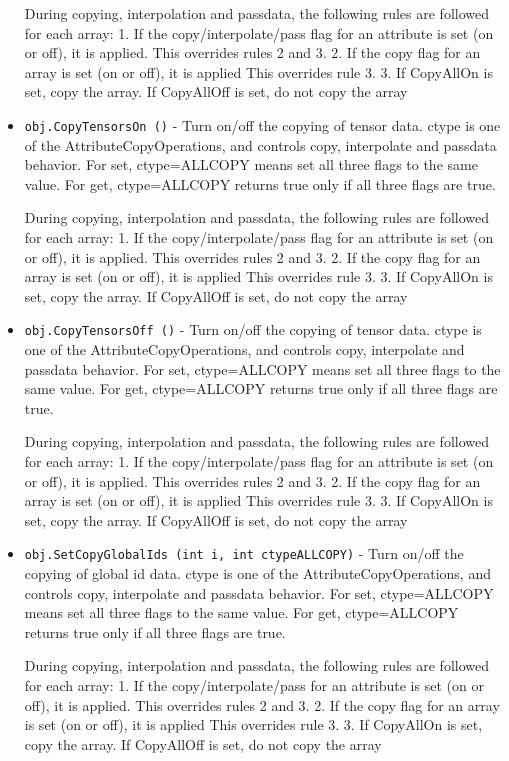 \begin{itemize}
 During copying, interpolation and passdata, the following rules are 
 followed for each array:
 1. If the copy/interpolate/pass flag for an attribute is set (on or off), it is applied.
    This overrides rules 2 and 3.
 2. If the copy flag for an array is set (on or off), it is applied
    This overrides rule 3.
 3. If CopyAllOn is set, copy the array.
    If CopyAllOff is set, do not copy the array

\item  \verb|obj.CopyTensorsOn ()| -  Turn on/off the copying of tensor data.
 ctype is one of the AttributeCopyOperations, and controls copy, 
 interpolate and passdata behavior.
 For set, ctype=ALLCOPY means set all three flags to the same value.
 For get, ctype=ALLCOPY returns true only if all three flags are true.

 During copying, interpolation and passdata, the following rules are 
 followed for each array:
 1. If the copy/interpolate/pass flag for an attribute is set (on or off), it is applied.
    This overrides rules 2 and 3.
 2. If the copy flag for an array is set (on or off), it is applied
    This overrides rule 3.
 3. If CopyAllOn is set, copy the array.
    If CopyAllOff is set, do not copy the array

\item  \verb|obj.CopyTensorsOff ()| -  Turn on/off the copying of tensor data.
 ctype is one of the AttributeCopyOperations, and controls copy, 
 interpolate and passdata behavior.
 For set, ctype=ALLCOPY means set all three flags to the same value.
 For get, ctype=ALLCOPY returns true only if all three flags are true.

 During copying, interpolation and passdata, the following rules are 
 followed for each array:
 1. If the copy/interpolate/pass flag for an attribute is set (on or off), it is applied.
    This overrides rules 2 and 3.
 2. If the copy flag for an array is set (on or off), it is applied
    This overrides rule 3.
 3. If CopyAllOn is set, copy the array.
    If CopyAllOff is set, do not copy the array

\item  \verb|obj.SetCopyGlobalIds (int i, int ctypeALLCOPY)| -  Turn on/off the copying of global id data.
 ctype is one of the AttributeCopyOperations, and controls copy, 
 interpolate and passdata behavior.
 For set, ctype=ALLCOPY means set all three flags to the same value.
 For get, ctype=ALLCOPY returns true only if all three flags are true.

 During copying, interpolation and passdata, the following rules are 
 followed for each array:
 1. If the copy/interpolate/pass for an attribute is set (on or off), it is applied.
    This overrides rules 2 and 3.
 2. If the copy flag for an array is set (on or off), it is applied
    This overrides rule 3.
 3. If CopyAllOn is set, copy the array.
    If CopyAllOff is set, do not copy the array


\end{itemize}
